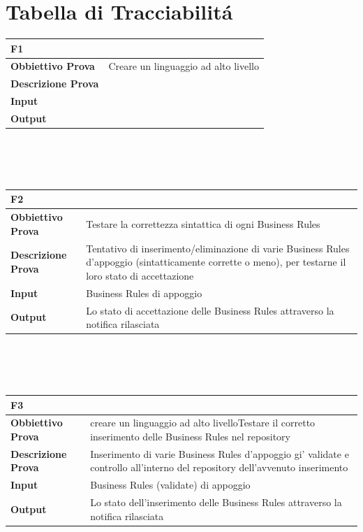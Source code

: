 \documentclass[11pt,titlepage,a4paper]{report}
\begin{document}
\section{Tabella di Tracciabilit\'a}
\begin{tabular}{||p{4.5cm}||p{7.5cm}||}
\hline
\textbf{\textsf{F1}}& \\
\hline
{\textbf {Obbiettivo Prova}}& Creare un linguaggio ad alto livello \\ \hline
{\textbf{Descrizione Prova}}&  \\ \hline
{\textbf{Input}}&  \\ \hline
{\textbf{Output}}& \\ \hline
\end{tabular} \\
\\
\\
\begin{tabular}{||p{4.5cm}||p{7.5cm}||}
\hline
\textbf{\textsf{F2}}& \\
\hline
{\textbf {Obbiettivo Prova}}& Testare la correttezza sintattica di ogni Business Rules \\ \hline
{\textbf{Descrizione Prova}}& Tentativo di inserimento/eliminazione di varie Business Rules d'appoggio (sintatticamente corrette o meno), per testarne il loro stato di accettazione \\ \hline
{\textbf{Input}}& Business Rules di appoggio \\ \hline
{\textbf{Output}}& Lo stato di accettazione delle Business Rules attraverso la notifica rilasciata \\ \hline
\end{tabular} \\
\\
\\
\begin{tabular}{||p{4.5cm}||p{7.5cm}||}
\hline
\textbf{\textsf{F3}}& \\
\hline
{\textbf {Obbiettivo Prova}}& creare un linguaggio ad alto livelloTestare il corretto inserimento delle Business Rules nel repository\\ \hline
{\textbf{Descrizione Prova}}&  Inserimento di varie Business Rules d'appoggio gi\a' validate e controllo all'interno del repository dell'avvenuto inserimento\\ \hline
{\textbf{Input}}& Business Rules (validate) di appoggio \\ \hline
{\textbf{Output}}& Lo stato dell'inserimento delle Business Rules attraverso la notifica rilasciata \\ \hline
\end{tabular} \\
\end{document}
